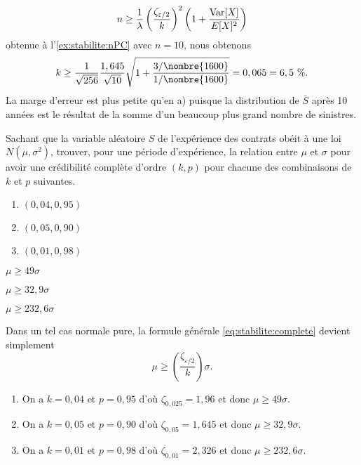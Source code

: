 \begin{exercice}
\begin{sol}
\begin{enumerate}
      \begin{equation*}
        n \geq \frac{1}{\lambda}
        \left(
          \frac{\zeta_{\varepsilon/2}}{k}
        \right)^2
        \left(
          1 + \frac{\operatorname{Var} [ X ]}{E [ X ]^2}
        \right)
      \end{equation*}
      obtenue à l'\autoref{ex:stabilite:nPC}
      avec $n = 10$, nous obtenons
      \begin{equation*}
        k \geq
        \frac{1}{\sqrt{256}} \frac{1,645}{\sqrt{10}}
        \sqrt{1 + \frac{3/\nombre{1600}}{1/\nombre{1600}}} = 0,065 = 6,5~\%.
      \end{equation*}
      La marge d'erreur est plus petite qu'en a) puisque la
      distribution de $\bar{S}$ après 10 années est le résultat de la
      somme d'un beaucoup plus grand nombre de sinistres.
    \end{enumerate}
  \end{sol}
\end{exercice}

\begin{exercice}
  Sachant que la variable aléatoire $S$ de l'expérience des contrats
  obéit à une loi $N(\mu, \sigma^2)$, trouver, pour une période
  d'expérience, la relation entre $\mu$ et $\sigma$ pour avoir une
  crédibilité complète d'ordre $(k, p)$ pour chacune des combinaisons
  de $k$ et $p$ suivantes.
  \begin{enumerate}
  \item $(0,04, 0,95)$
  \item $(0,05, 0,90)$
  \item $(0,01, 0,98)$
  \end{enumerate}
  \begin{rep}
    \begin{inparaenum}
    \item $\mu \geq 49 \sigma$
    \item $\mu \geq 32,9 \sigma$
    \item $\mu \geq 232,6 \sigma$
    \end{inparaenum}
  \end{rep}
  \begin{sol}
    Dans un tel cas normale pure, la formule générale
    \eqref{eq:stabilite:complete} devient simplement
    \begin{equation*}
      \mu \geq \left( \frac{\zeta_{\varepsilon/2}}{k} \right)
      \sigma.
    \end{equation*}
    \begin{enumerate}
    \item On a $k = 0,04$ et $p = 0,95$ d'où $\zeta_{0,025} = 1,96$ et
      donc $\mu \geq 49 \sigma$.
    \item On a $k = 0,05$ et $p = 0,90$ d'où $\zeta_{0,05} = 1,645$ et
      donc $\mu \geq 32,9 \sigma$.
    \item On a $k = 0,01$ et $p = 0,98$ d'où $\zeta_{0,01} = 2,326$ et
      donc $\mu \geq 232,6 \sigma$.
    \end{enumerate}
  \end{sol}
\end{exercice}

